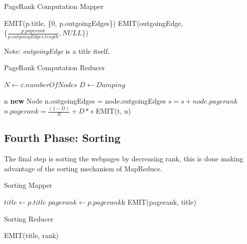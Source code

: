 \begin{algorithm}
	\caption{PageRank Computation Mapper}\label{Mapper}
		\begin{algorithmic}[1]
			
			\State EMIT(p.title, \{0, p.outgoingEdges\})
			\State EMIT(outgoingEdge, $\{\frac{p.pagerank}{p.outgoingEdges.length}, NULL\}$)
			\EndFor
			\EndProcedure
	\end{algorithmic}
\end{algorithm}
Note: \textit{outgoingEdge} is a title itself.


\begin{algorithm}[H]
	\caption{PageRank Computation Reducer}\label{Reducer}
		\begin{algorithmic}[1]
				\State $N \gets c.numberOfNodes$
				\State $D \gets Damping$
			\EndProcedure
		
					\State n \textbf{new} Node
							\State n.outgoingEdges = node.outgoingEdges
						\Else
							\State $s = s + node.pagerank$
						\EndIf
					\EndFor
					\State$n.pagerank =  \frac{(1-D)}{N} + D*s$
					\State EMIT(t, n)
			\EndProcedure
	\end{algorithmic}
\end{algorithm}



\subsection{Fourth Phase: Sorting}
The final step is sorting the webpages by decreasing rank, this is done making advantage of the sorting mechanism of MapReduce.

\begin{algorithm}[H]
	\caption{Sorting Mapper}\label{Mapper}
	\begin{algorithmic}[1]
		\State $title \gets p.title$
		\State $pagerank \gets p.pagerank$k
		\State EMIT(pagerank, title)
		\EndProcedure
	\end{algorithmic}
\end{algorithm}

\begin{algorithm}[H]
	\caption{Sorting Reducer}\label{Reducer}
	\begin{algorithmic}[1]
		\State EMIT(title, rank)
		\EndFor
		\EndProcedure
	\end{algorithmic}
\end{algorithm}
